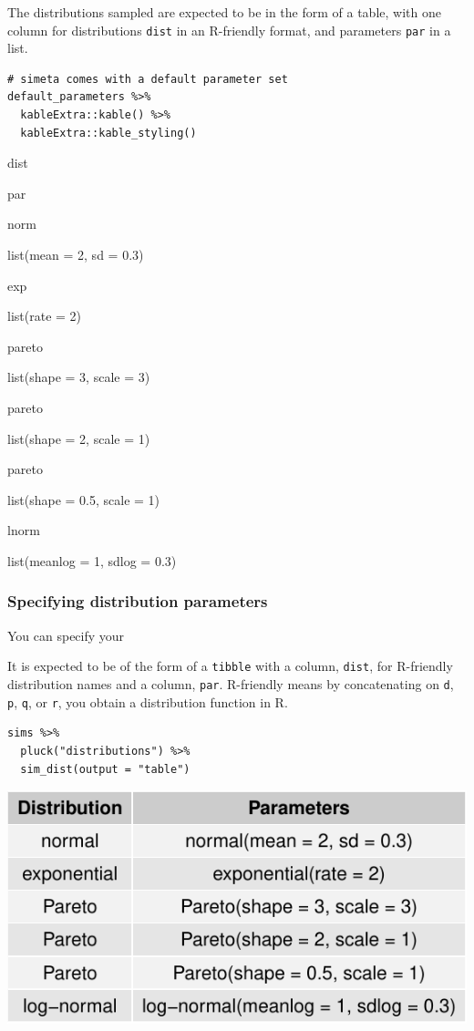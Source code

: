\documentclass[
]{article}
\begin{document}
The distributions sampled are expected to be in the form of a table,
with one column for distributions \texttt{dist} in an R-friendly format,
and parameters \texttt{par} in a list.

\begin{verbatim}
# simeta comes with a default parameter set
default_parameters %>% 
  kableExtra::kable() %>% 
  kableExtra::kable_styling()
\end{verbatim}

dist

par

norm

list(mean = 2, sd = 0.3)

exp

list(rate = 2)

pareto

list(shape = 3, scale = 3)

pareto

list(shape = 2, scale = 1)

pareto

list(shape = 0.5, scale = 1)

lnorm

list(meanlog = 1, sdlog = 0.3)

\hypertarget{specify-dist}{%
\subsubsection{Specifying distribution parameters}\label{specify-dist}}

You can specify your

It is expected to be of the form of a \texttt{tibble} with a column,
\texttt{dist}, for R-friendly distribution names and a column,
\texttt{par}. R-friendly means by concatenating on \texttt{d},
\texttt{p}, \texttt{q}, or \texttt{r}, you obtain a distribution
function in R.

\begin{verbatim}
sims %>%
  pluck("distributions") %>% 
  sim_dist(output = "table")
\end{verbatim}

\includegraphics{simeta-demo_files/figure-latex/default parameters vis-1.pdf}
\end{document}
